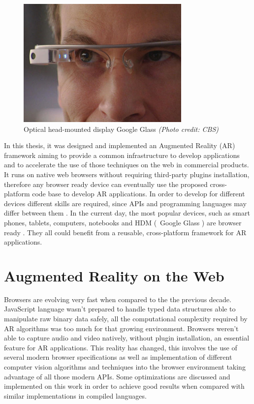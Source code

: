 \begin{figure}[!htb]
  \centering
  \includegraphics[width=240pt]{chapters/basic_concepts/google_glass.png}
  \caption{Optical head-mounted display Google Glass \cite{Glass2013} \textit{(Photo credit: CBS)}}
  \label{figure:google_glass}
\end{figure}

In this thesis, it was designed and implemented an Augmented Reality (AR) framework aiming to provide a common infrastructure to develop applications and to accelerate the use of those techniques on the web in commercial products. It runs on native web browsers without requiring third-party plugins installation, therefore any browser ready device can eventually use the proposed cross-platform code base to develop AR applications. In order to develop for different devices different skills are required, since APIs and programming languages may differ between them \cite{MDN2013,International2009}. In the current day, the most popular devices, such as smart phones, tablets, computers, notebooks and HDM (\ie\ Google Glass \cite{Glass2013}) \cite{Benford1998} are browser ready \cite{Hickson2013}. They all could benefit from a reusable, cross-platform framework for AR applications.


\section{Augmented Reality on the Web} %
\label{sec:basic_concepts:augmented_reality_on_the_web}

Browsers are evolving very fast when compared to the the previous decade. JavaScript language wasn't prepared to handle typed data structures able to manipulate raw binary data safely, all the computational complexity required by AR algorithms was too much for that growing environment. Browsers weren't able to capture audio and video natively, without plugin installation, an essential feature for AR applications. This reality has changed, this involves the use of several modern browser specifications as well as implementation of different computer vision algorithms and techniques into the browser environment taking advantage of all those modern APIs. Some optimizations are discussed and implemented on this work in order to achieve good results when compared with similar implementations in compiled languages.

